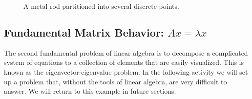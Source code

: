 \begin{problem}
    \begin{figure}[ht!]
        \begin{center}
        \end{center}
        \caption{A metal rod partitioned into several discrete points.}
        \label{fig:10.1.rod}
    \end{figure}
\end{problem}

\subsection*{Fundamental Matrix Behavior: $Ax = \lambda x$}
The second fundamental problem of linear algebra is to decompose a complicated system of
equations to a collection of elements that are easily visualized.  This is known as the
eigenvector-eigenvalue problem.  In the following activity we will set up a problem that,
without the tools of linear algebra, are very difficult to answer.  We will return to this
example in future sections.

